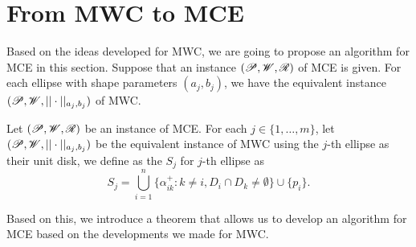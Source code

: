 \section{From MWC to MCE}

Based on the ideas developed for MWC, we are going to propose an algorithm for MCE in this section.
Suppose that an instance $(\mathscr{P}, \mathscr{W}, \mathscr{R})$ of MCE is given. For each ellipse with shape parameters $(a_j, b_j)$, we have the equivalent instance $(\mathscr{P}, \mathscr{W}, ||\cdot||_{a_j,b_j})$ of MWC.

\begin{definicao}
	Let $(\mathscr{P}, \mathscr{W}, \mathscr{R})$ be an instance of MCE. For each $j \in \{1, \dots, m\}$, let \mbox{$(\mathscr{P},  \mathscr{W}, ||\cdot||_{a_j,b_j})$} be the equivalent instance of MWC using the $j$-th ellipse as their unit disk, we define as the  $S_j$ for $j$-th ellipse as
	\begin{equation*}
	S_j = \bigcup_{i=1}^n \{\alpha_{ik}^+ \colon k\neq i, D_i \cap D_k \neq \emptyset\}\cup \{p_i\}.
	\end{equation*}
\end{definicao}

Based on this, we introduce a theorem that allows us to develop an algorithm for MCE based on the developments we made for MWC.

